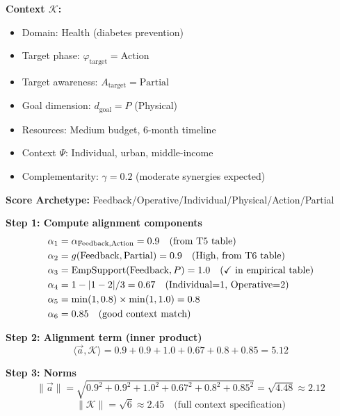 \begin{tcolorbox}[colback=yellow!5!white, colframe=yellow!75!black,
    title=\textbf{Worked Example: Inner Product Score Calculation}]

\textbf{Context $\mathcal{K}$:}
\begin{itemize}[nosep]
    \item Domain: Health (diabetes prevention)
    \item Target phase: $\varphi_{\text{target}} = \text{Action}$
    \item Target awareness: $A_{\text{target}} = \text{Partial}$
    \item Goal dimension: $d_{\text{goal}} = P$ (Physical)
    \item Resources: Medium budget, 6-month timeline
    \item Context $\Psi$: Individual, urban, middle-income
    \item Complementarity: $\gamma = 0.2$ (moderate synergies expected)
\end{itemize}

\textbf{Score Archetype:} Feedback/Operative/Individual/Physical/Action/Partial

\medskip
\textbf{Step 1: Compute alignment components}
\begin{align*}
\alpha_1 &= \alpha_{\text{Feedback}, \text{Action}} = 0.9 \quad \text{(from T5 table)} \\
\alpha_2 &= g(\text{Feedback}, \text{Partial}) = 0.9 \quad \text{(High, from T6 table)} \\
\alpha_3 &= \text{EmpSupport}(\text{Feedback}, P) = 1.0 \quad \text{(\checkmark\ in empirical table)} \\
\alpha_4 &= 1 - |1 - 2|/3 = 0.67 \quad \text{(Individual=1, Operative=2)} \\
\alpha_5 &= \min(1, 0.8) \times \min(1, 1.0) = 0.8 \\
\alpha_6 &= 0.85 \quad \text{(good context match)}
\end{align*}

\textbf{Step 2: Alignment term (inner product)}
\begin{equation*}
\langle \vec{a}, \mathcal{K} \rangle = 0.9 + 0.9 + 1.0 + 0.67 + 0.8 + 0.85 = \mathbf{5.12}
\end{equation*}

\textbf{Step 3: Norms}
\begin{equation*}
\|\vec{a}\| = \sqrt{0.9^2 + 0.9^2 + 1.0^2 + 0.67^2 + 0.8^2 + 0.85^2} = \sqrt{4.48} \approx 2.12
\end{equation*}
\begin{equation*}
\|\mathcal{K}\| = \sqrt{6} \approx 2.45 \quad \text{(full context specification)}
\end{equation*}


\end{tcolorbox}
